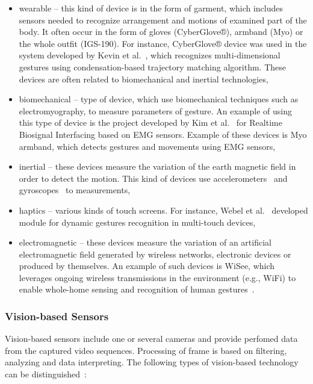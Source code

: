 \begin{itemize}

\item wearable -- this kind of device is in the form of garment, which includes sensors needed to recognize arrangement and motions of examined part of the body. It often occur in the form of gloves (CyberGlove®), armband (Myo) or the whole outfit (IGS-190). For instance, CyberGlove® device was used in the system developed by Kevin et al.~\cite{KevinCyberGloves}, which recognizes multi-dimensional gestures using condensation-based trajectory matching algorithm. These devices are often related to biomechanical and inertial technologies, 

\item biomechanical -- type of device, which use biomechanical techniques such as electromyography, to measure parameters of gesture. An example of using this type of device is the project developed by Kim et al.~\cite{Kim:2008:EHG:1378773.1378778} for Realtime Biosignal Interfacing based on EMG sensors. Example of these devices is Myo armband, which detects gestures and movements using EMG sensors,

\item inertial -- these devices measure the variation of the earth magnetic field in order to detect the motion. This kind of devices use accelerometers~\cite{LiuAccelerometer} and gyroscopes~\cite{TUD-CS-2009-0292} to measurements,

\item haptics -- various kinds of touch screens. For instance, Webel et al.~\cite{conf/vrst/WebelKZ08} developed module for dynamic gestures recognition in multi-touch devices,

\item electromagnetic -- these devices measure the variation of an artificial electromagnetic field generated by wireless networks, electronic devices or produced by themselves. An example of such devices is WiSee, which leverages ongoing wireless transmissions in the environment (e.g., WiFi) to enable whole-home sensing and recognition of human gestures~\cite{Pu:2013:WGR:2500423.2500436}.

\end{itemize}

\subsubsection*{Vision-based Sensors}

Vision-based sensors include one or several cameras and provide perfomed data from the captured video sequences. Processing of frame is based on filtering, analyzing and data interpreting. The following types of vision-based technology can be distinguished~\cite{kaaniche2009human}\cite{Wu:1999:VGR:647591.728702}:


